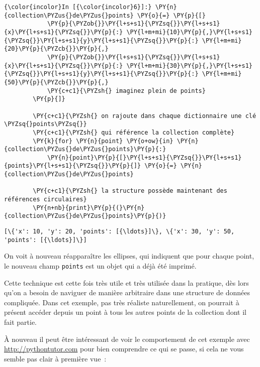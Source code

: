     \begin{Verbatim}[commandchars=\\\{\},frame=single,framerule=0.3mm,rulecolor=\color{cellframecolor}]
{\color{incolor}In [{\color{incolor}6}]:} \PY{n}{collection\PYZus{}de\PYZus{}points} \PY{o}{=} \PY{p}{[}
            \PY{p}{\PYZob{}}\PY{l+s+s1}{\PYZsq{}}\PY{l+s+s1}{x}\PY{l+s+s1}{\PYZsq{}}\PY{p}{:} \PY{l+m+mi}{10}\PY{p}{,}\PY{l+s+s1}{\PYZsq{}}\PY{l+s+s1}{y}\PY{l+s+s1}{\PYZsq{}}\PY{p}{:} \PY{l+m+mi}{20}\PY{p}{\PYZcb{}}\PY{p}{,}
            \PY{p}{\PYZob{}}\PY{l+s+s1}{\PYZsq{}}\PY{l+s+s1}{x}\PY{l+s+s1}{\PYZsq{}}\PY{p}{:} \PY{l+m+mi}{30}\PY{p}{,}\PY{l+s+s1}{\PYZsq{}}\PY{l+s+s1}{y}\PY{l+s+s1}{\PYZsq{}}\PY{p}{:} \PY{l+m+mi}{50}\PY{p}{\PYZcb{}}\PY{p}{,}
            \PY{c+c1}{\PYZsh{} imaginez plein de points}
        \PY{p}{]}
        
        \PY{c+c1}{\PYZsh{} on rajoute dans chaque dictionnaire une clé \PYZsq{}points\PYZsq{}}
        \PY{c+c1}{\PYZsh{} qui référence la collection complète}
        \PY{k}{for} \PY{n}{point} \PY{o+ow}{in} \PY{n}{collection\PYZus{}de\PYZus{}points}\PY{p}{:}
            \PY{n}{point}\PY{p}{[}\PY{l+s+s1}{\PYZsq{}}\PY{l+s+s1}{points}\PY{l+s+s1}{\PYZsq{}}\PY{p}{]} \PY{o}{=} \PY{n}{collection\PYZus{}de\PYZus{}points}
        
        \PY{c+c1}{\PYZsh{} la structure possède maintenant des références circulaires}
        \PY{n+nb}{print}\PY{p}{(}\PY{n}{collection\PYZus{}de\PYZus{}points}\PY{p}{)}
\end{Verbatim}


    \begin{Verbatim}[commandchars=\\\{\},frame=single,framerule=0.3mm,rulecolor=\color{cellframecolor}]
[\{'x': 10, 'y': 20, 'points': [{\ldots}]\}, \{'x': 30, 'y': 50, 'points': [{\ldots}]\}]
\end{Verbatim}

    On voit à nouveau réapparaître les ellipses, qui indiquent que pour
chaque point, le nouveau champ \texttt{points} est un objet qui a déjà
été imprimé.

Cette technique est cette fois très utile et très utilisée dans la
pratique, dès lors qu'on a besoin de naviguer de manière arbitraire dans
une structure de données compliquée. Dans cet exemple, pas très réaliste
naturellement, on pourrait à présent accéder depuis un point à tous les
autres points de la collection dont il fait partie.

    À nouveau il peut être intéressant de voir le comportement de cet
exemple avec \url{http://pythontutor.com} pour bien comprendre ce qui se
passe, si cela ne vous semble pas clair à première vue~:

